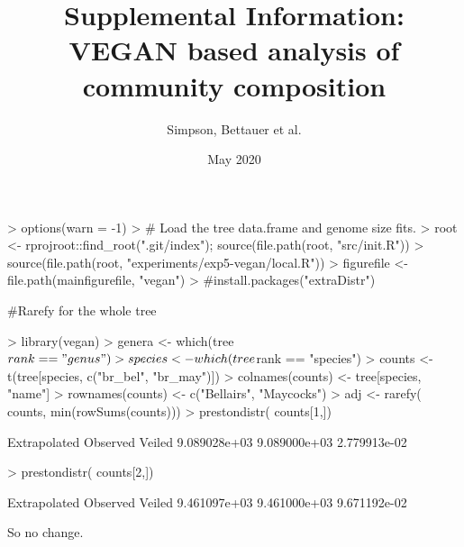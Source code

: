 \documentclass{article}
\title{Supplemental Information: VEGAN based analysis of community composition }
\date{May 2020}
\author{Simpson, Bettauer et al.}
\begin{document}


\maketitle

\begin{Schunk}
\begin{Sinput}
> options(warn = -1)
> # Load the tree data.frame and genome size fits. 
> root <- rprojroot::find_root(".git/index");  source(file.path(root, "src/init.R"))
> source(file.path(root, "experiments/exp5-vegan/local.R"))
> figurefile <- file.path(mainfigurefile, "vegan")
> #install.packages("extraDistr")
\end{Sinput}
\end{Schunk}

#Rarefy for the whole tree
\begin{Schunk}
\begin{Sinput}
> library(vegan)
> genera <- which(tree$rank == "genus")
> species <- which(tree$rank == "species")
> counts <- t(tree[species, c("br_bel", "br_may")])
> colnames(counts) <- tree[species, "name"]
> rownames(counts) <- c("Bellairs", "Maycocks")
> adj <- rarefy( counts, min(rowSums(counts)))
> prestondistr( counts[1,]) %>% veiledspec
\end{Sinput}
\begin{Soutput}
Extrapolated     Observed       Veiled 
9.089028e+03 9.089000e+03 2.779913e-02 
\end{Soutput}
\begin{Sinput}
> prestondistr( counts[2,]) %>% veiledspec
\end{Sinput}
\begin{Soutput}
Extrapolated     Observed       Veiled 
9.461097e+03 9.461000e+03 9.671192e-02 
\end{Soutput}
\end{Schunk}
So no change.
\end{document}
